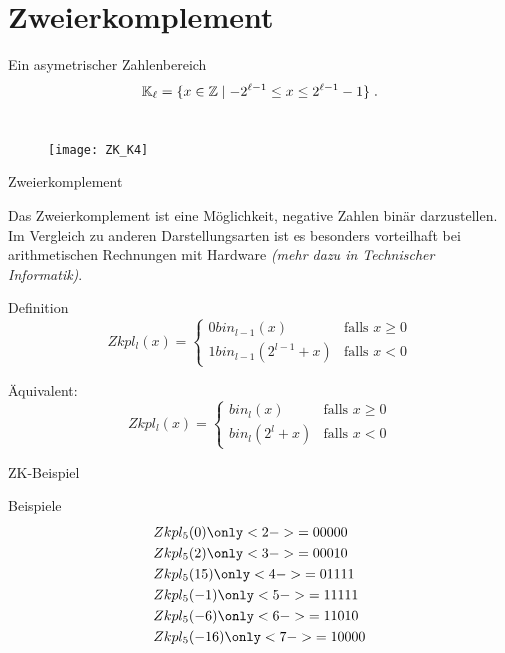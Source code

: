 \section{Zweierkomplement}

\begin{frame}{Ein asymetrischer Zahlenbereich}
	\[
	\mathbb{K}_{\ell} = \{ x\in \mathbb{Z} \mid -2^{\ell-1} \leq x \leq 2^{\ell-1} -1 \} \;.
	\]
	\\[0.2cm]
	
	\begin{figure}
		\centering
		\texttt{[image: ZK\_K4]}
	\end{figure}
	
\end{frame}

\begin{frame}{Zweierkomplement}

	Das Zweierkomplement ist eine Möglichkeit, negative Zahlen binär darzustellen. Im Vergleich zu anderen Darstellungsarten ist es besonders vorteilhaft bei arithmetischen Rechnungen mit Hardware \textit{(mehr dazu in Technischer Informatik)}.

	\begin{block}{Definition}
		$$Zkpl_l(x) = \begin{cases} 0 bin_{l-1}(x) & \text{falls } x \geq 0 \\ 1 bin_{l-1}(2^{l-1}+x) & \text{falls } x < 0\end{cases}$$
		
		Äquivalent:
		$$Zkpl_l(x) = \begin{cases} bin_{l}(x) & \text{falls } x \geq 0 \\ bin_{l}(2^{l}+x) & \text{falls } x < 0\end{cases}$$
	\end{block}
\end{frame}

\begin{frame}{ZK-Beispiel}
	\begin{block}{Beispiele}
		\begin{align*}
			&Zkpl_5(0) \only<2->{= 00000} \\
			&Zkpl_5(2) \only<3->{= 00010} \\
			&Zkpl_5(15) \only<4->{= 01111} \\
			&Zkpl_5(-1) \only<5->{= 11111} \\
			&Zkpl_5(-6) \only<6->{= 11010} \\
			&Zkpl_5(-16) \only<7->{= 10000}
		\end{align*}
	\end{block}
\end{frame}

